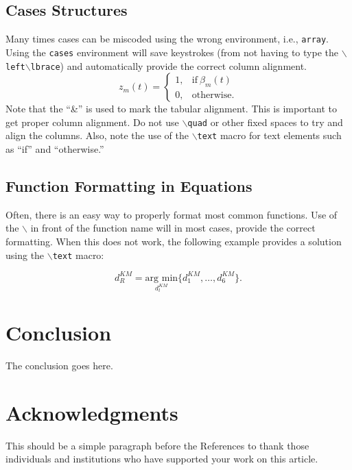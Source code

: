 \documentclass[journal,9pt]{IEEEtran}
\begin{document}
\subsection{Cases Structures}
Many times cases can be miscoded using the wrong environment, i.e., {\tt{array}}. Using the {\tt{cases}} environment will save keystrokes (from not having to type the $\backslash${\tt{left}}$\backslash${\tt{lbrace}}) and automatically provide the correct column alignment.
\begin{equation*}
  {z_m(t)} = \begin{cases}
    1,   & {\text{if}}\ {\beta }_m(t) \\
    {0,} & {\text{otherwise.}}
  \end{cases}
\end{equation*}
\noindent
\noindent Note that the ``\&'' is used to mark the tabular alignment. This is important to get  proper column alignment. Do not use $\backslash${\tt{quad}} or other fixed spaces to try and align the columns. Also, note the use of the $\backslash${\tt{text}} macro for text elements such as ``if'' and ``otherwise.''

\subsection{Function Formatting in Equations}
Often, there is an easy way to properly format most common functions. Use of the $\backslash$ in front of the function name will in most cases, provide the correct formatting. When this does not work, the following example provides a solution using the $\backslash${\tt{text}} macro:

\begin{equation*}
  d_{R}^{KM} = \underset {d_{l}^{KM}} {\text{arg min}} \{ d_{1}^{KM},\ldots,d_{6}^{KM}\}.
\end{equation*}


\section{Conclusion}
The conclusion goes here.


\section*{Acknowledgments}
This should be a simple paragraph before the References to thank those individuals and institutions who have supported your work on this article.
\end{document}
